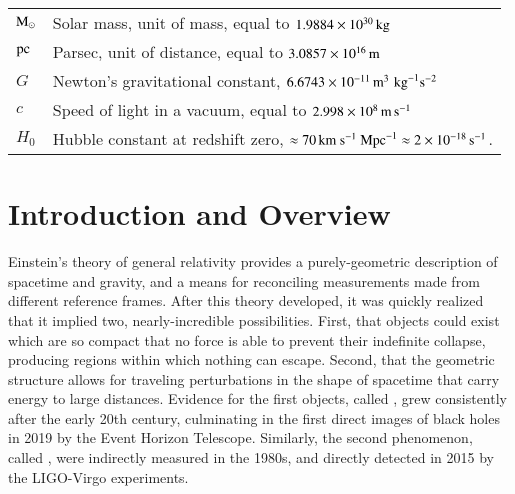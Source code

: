 \documentclass[onecolumn,authoryear]{els-mrw}
\begin{document}
    \begin{glossary}
    \begin{tabular}{@{}lp{34pc}@{}}
    $\textrm{M}_{\odot}$ & Solar mass, unit of mass, equal to $1.9884\times\nobreak10^{30} \, \mathrm{kg}$ \\
    $\mathrm{pc}$ & Parsec, unit of distance, equal to $3.0857\times\nobreak10^{16} \, \mathrm{m}$ \\
    $G$ & Newton's gravitational constant, $6.6743\times\nobreak10^{{-11}} \, \mathrm{m}^3 \, \, \mathrm{kg}^{-1} \mathrm{s}^{-2}$ \\
    $c$ & Speed of light in a vacuum, equal to $2.998\times\nobreak10^{8} \, \mathrm{m} \, \mathrm{s}^{-1}$ \\
    $H_0$ & Hubble constant at redshift zero, $\approx 70 \, \textrm{km}~\textrm{s}^{-1}~\textrm{Mpc}^{-1} \approx 2\times\nobreak10^{-18} \, \mathrm{s}^{-1}$.
    \end{tabular}
    \end{glossary}







\section{Introduction and Overview}\label{sec:intro}

Einstein's theory of general relativity provides a purely-geometric description of spacetime and gravity, and a means for reconciling measurements made from different reference frames.  After this theory developed, it was quickly realized that it implied two, nearly-incredible possibilities.  First, that objects could exist which are so compact that no force is able to prevent their indefinite collapse, producing regions within which nothing can escape.  Second, that the geometric structure allows for traveling perturbations in the shape of spacetime that carry energy to large distances.  Evidence for the first objects, called , grew consistently after the early 20th century, culminating in the first direct images of black holes in 2019 by the Event Horizon Telescope.  Similarly, the second phenomenon, called , were indirectly measured in the 1980s, and directly detected in 2015 by the LIGO-Virgo experiments.
\end{document}
